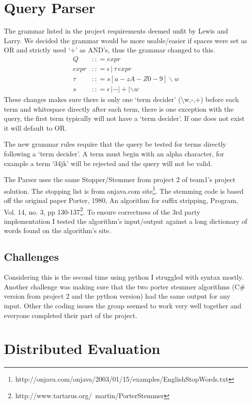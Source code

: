 \documentclass[letterpaper,11pt,twoside]{article}
\begin{document}
\section{Query Parser}
The grammar listed in the project requirements deemed unfit by Lewis and Larry. We decided the grammar would be more usable/easier if spaces were set as OR and strictly used `+' as AND's, thus the grammar changed to this.
\begin{align*}
	Q &:: = expr \\
	expr &:: = \epsilon \, | \, \tau \, expr \\
	\tau &:: = s[a-zA-Z0-9]\backslash w \\
	s &:: = \epsilon \, | - | + | \backslash w
\end{align*}
These changes makes sure there is only one `term decider' (\textbackslash w,-,+) before each term and whitespace directly after each term, there is one exception with the query, the first term typically will not have a `term decider'. If one does not exist it will default to OR.  

The new grammar rules require that the query be tested for terms directly following a `term decider'. A term must begin with an alpha character, for example a term `34jk' will be rejected and the query will not be valid.

The Parser uses the same Stopper/Stemmer from project 2 of team1’s project solution. The stopping list is from onjava.com site\footnote{http://onjava.com/onjava/2003/01/15/examples/EnglishStopWords.txt}. The stemming code is based off the original paper Porter, 1980, An algorithm for suffix stripping, Program, Vol. 14, no. 3, pp 130-137\footnote{http://www.tartarus.org/~martin/PorterStemmer}. To ensure correctness of the 3rd party implementation I tested the algorithm’s input/output against a long dictionary of words found on the algorithm's site.

\subsection{Challenges}
Considering this is the second time using python I struggled with syntax mostly. Another challenge was making sure that the two porter stemmer algorithms (C\# version from project 2 and the python version) had the same output for any input. Other the coding issues the group seemed to work very well together and everyone completed their part of the project.


\section{Distributed Evaluation}
\end{document}
